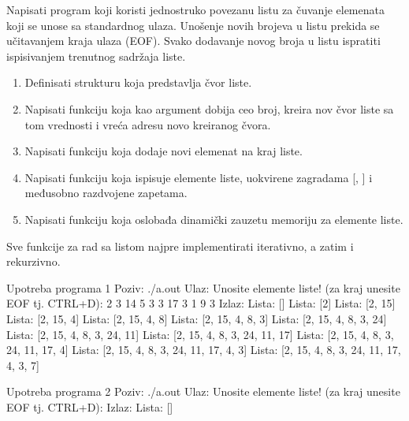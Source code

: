 \begin{Exercise}[label=602]
Napisati program koji koristi jednostruko povezanu listu za čuvanje elemenata koji se unose sa standardnog ulaza. 
Unošenje novih brojeva u listu prekida se učitavanjem kraja ulaza (EOF). 
Svako dodavanje novog broja u listu ispratiti ispisivanjem trenutnog sadržaja liste. 
\begin{enumerate}
\item Definisati strukturu  koja predstavlja čvor liste.
\item Napisati funkciju koja kao argument dobija ceo broj, kreira nov čvor liste sa tom vrednosti i vreća adresu novo kreiranog čvora.
 \item Napisati funkciju koja dodaje novi elemenat na kraj liste. 
 \item Napisati funkciju koja ispisuje elemente liste, uokvirene zagradama [, ] i međusobno razdvojene zapetama.
 \item Napisati funkciju koja oslobađa dinamički zauzetu memoriju za elemente liste.
 \end{enumerate}

 Sve funkcije za rad sa listom najpre implementirati iterativno, a zatim i rekurzivno.


\begin{maxitest}
\begin{test}{Upotreba programa 1}
Poziv: ./a.out
Ulaz:
	Unosite elemente liste! (za kraj unesite EOF tj. CTRL+D): 2 3 14 5 3 3 17 3 1 9 3
Izlaz:
        Lista: []
        Lista: [2]
        Lista: [2, 15]
        Lista: [2, 15, 4]
        Lista: [2, 15, 4, 8]
        Lista: [2, 15, 4, 8, 3]
        Lista: [2, 15, 4, 8, 3, 24]
        Lista: [2, 15, 4, 8, 3, 24, 11]
        Lista: [2, 15, 4, 8, 3, 24, 11, 17]
        Lista: [2, 15, 4, 8, 3, 24, 11, 17, 4]
        Lista: [2, 15, 4, 8, 3, 24, 11, 17, 4, 3]
        Lista: [2, 15, 4, 8, 3, 24, 11, 17, 4, 3, 7]
\end{test}
\end{maxitest}



\begin{maxitest}
\begin{test}{Upotreba programa 2}
Poziv: ./a.out
Ulaz:
	Unosite elemente liste! (za kraj unesite EOF tj. CTRL+D): 
Izlaz:
        Lista: []
\end{test}
\end{maxitest}

\end{Exercise}

